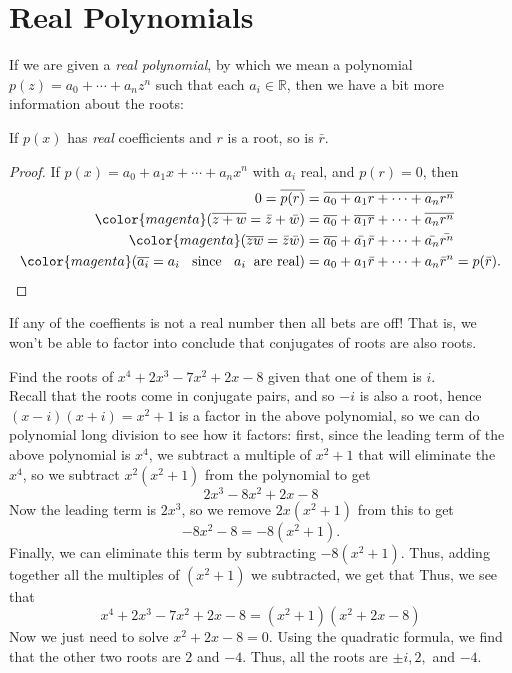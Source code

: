 \documentclass[11pt,dvipsnames]{book}
\numberwithin{figure}{section} %
\numberwithin{table}{section} %
\begin{document}
\section{Real Polynomials}

If we are given a {\it real polynomial}, by which we mean a polynomial $p(z)=a_{0}+\cdots + a_{n}z^{n}$ such that each $a_i \in \mathbb{R}$, then we have a bit more information about the roots:

\begin{theorem} If $p(x)$ has {\it real} coefficients and $r$ is a root, so is $\bar{r}$.
\end{theorem}

\begin{proof}
If $p(x)=a_0+a_{1}x+\cdots +a_{n}x^n$ with $a_{i}$ real, and $p(r)=0$, then
\begin{align*}
0 =\overline{p(r)}
 & =\overline{a_0+a_{1}r+\cdots +a_{n}r^n} \\
{\color{magenta} (\overline{z+w}=\bar{z}+\bar{w})} & = \overline{a_0}+\overline{a_1 r}+\cdots + \overline{ a_n r^n} \\
{\color{magenta} (\overline{zw}=\bar{z}\bar{w})} & =\overline{a_0}+\bar{a_1} \bar{ r}+\cdots + \bar{ a_n}\bar{ r^n} \\
{\color{magenta} (\overline{a_{i}}=a_{i}\;\; \mbox{ since }\;\;a_{i} \;\; \mbox{are real})} &  ={a_0}+{a_1} \bar{ r}+\cdots + { a_n}\bar{ r}^n = p(\bar{r}).
\end{align*}

\end{proof}


 If any of the coeffients is not a real number then all bets are off! That is, we won't be able to factor into conclude that conjugates of roots are also roots. \\

\begin{example}
Find the roots of $x^4+2x^3-7x^2+2x-8$ given that one of them is $i$. \\

Recall that the roots come in conjugate pairs, and so $-i$ is also a root, hence $(x-i)(x+i)=x^2+1$ is a factor in the above polynomial, so we can do polynomial long division to see how it factors: first, since the leading term of the above polynomial is $x^4$, we subtract a multiple of $x^2+1$ that will eliminate the $x^4$, so we subtract $x^2(x^2+1)$ from the polynomial to get
\[
2x^3-8x^2+2x-8\]
Now the leading term is $2x^3$, so we remove $2x(x^2+1)$ from this to get
\[
-8x^2-8=-8(x^2+1).
\]
Finally, we can eliminate this term by subtracting $-8(x^2+1)$. Thus, adding together all the multiples of $(x^2+1)$ we subtracted, we get that
Thus, we see that
\[
x^4+2x^3-7x^2+2x-8=(x^2+1)(x^2+2x-8)
\]
Now we just need to solve $x^2+2x-8=0$. Using the quadratic formula, we find that the other two roots are $2$ and $-4$. Thus, all the roots are $\pm i, 2,$ and $-4$.
\end{example}
\end{document}
